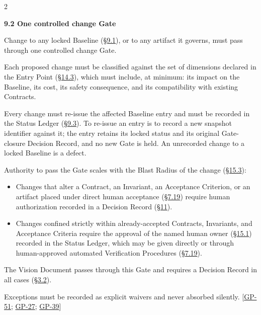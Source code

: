 \begin{multicols}{2}
\hypertarget{nss-9.2}{}

\par\smallskip\noindent\textbf{9.2 One controlled change Gate}\par\nopagebreak

Change to any locked Baseline (\hyperlink{nss-9.1}{\S9.1}), or to any artifact it governs, must pass through one controlled change Gate.

Each proposed change must be classified against the set of dimensions declared in the Entry Point (\hyperlink{nss-14.3}{\S14.3}), which must include, at minimum: its impact on the Baseline, its cost, its safety consequence, and its compatibility with existing Contracts.

Every change must re-issue the affected Baseline entry and must be recorded in the Status Ledger (\hyperlink{nss-9.3}{\S9.3}). To re-issue an entry is to record a new snapshot identifier against it; the entry retains its locked status and its original Gate-closure Decision Record, and no new Gate is held. An unrecorded change to a locked Baseline is a defect.

Authority to pass the Gate scales with the Blast Radius of the change (\hyperlink{nss-15.3}{\S15.3}):

\begin{itemize}\setlength{\itemsep}{0pt}\setlength{\parskip}{0pt}

\item Changes that alter a Contract, an Invariant, an Acceptance Criterion, or an artifact placed under direct human acceptance (\hyperlink{nss-7.19}{\S7.19}) require human authorization recorded in a Decision Record (\hyperlink{nss-11}{\S11}).

\item Changes confined strictly within already-accepted Contracts, Invariants, and Acceptance Criteria require the approval of the named human owner (\hyperlink{nss-15.1}{\S15.1}) recorded in the Status Ledger, which may be given directly or through human-approved automated Verification Procedures (\hyperlink{nss-7.19}{\S7.19}).

\end{itemize}

The Vision Document passes through this Gate and requires a Decision Record in all cases (\hyperlink{nss-3.2}{\S3.2}).

Exceptions must be recorded as explicit waivers and never absorbed silently. [\hyperlink{gp-51}{GP-51}; \hyperlink{gp-27}{GP-27}; \hyperlink{gp-39}{GP-39}]


\end{multicols}
